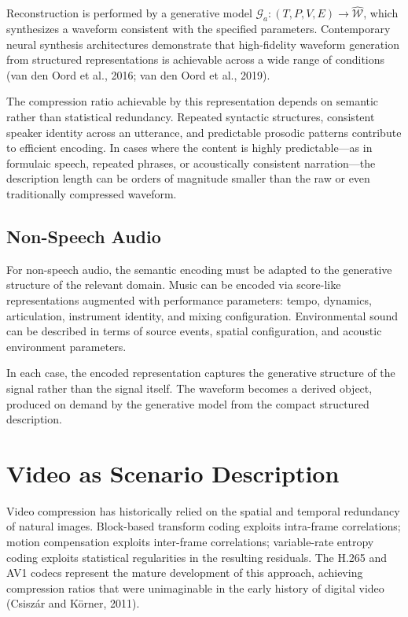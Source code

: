 \documentclass[11pt,a4paper]{article}
\theoremstyle{definition}
\theoremstyle{remark}
\begin{document}
Reconstruction is performed by a generative model $\mathcal{G}_a : (T, P, V, E) \rightarrow \widehat{\mathcal{W}}$, which synthesizes a waveform consistent with the specified parameters. Contemporary neural synthesis architectures demonstrate that high-fidelity waveform generation from structured representations is achievable across a wide range of conditions (van den Oord et al., 2016; van den Oord et al., 2019).

The compression ratio achievable by this representation depends on semantic rather than statistical redundancy. Repeated syntactic structures, consistent speaker identity across an utterance, and predictable prosodic patterns contribute to efficient encoding. In cases where the content is highly predictable---as in formulaic speech, repeated phrases, or acoustically consistent narration---the description length can be orders of magnitude smaller than the raw or even traditionally compressed waveform.

\subsection{Non-Speech Audio}

For non-speech audio, the semantic encoding must be adapted to the generative structure of the relevant domain. Music can be encoded via score-like representations augmented with performance parameters: tempo, dynamics, articulation, instrument identity, and mixing configuration. Environmental sound can be described in terms of source events, spatial configuration, and acoustic environment parameters.

In each case, the encoded representation captures the generative structure of the signal rather than the signal itself. The waveform becomes a derived object, produced on demand by the generative model from the compact structured description.

\section{Video as Scenario Description}
\label{sec:video}

Video compression has historically relied on the spatial and temporal redundancy of natural images. Block-based transform coding exploits intra-frame correlations; motion compensation exploits inter-frame correlations; variable-rate entropy coding exploits statistical regularities in the resulting residuals. The H.265 and AV1 codecs represent the mature development of this approach, achieving compression ratios that were unimaginable in the early history of digital video (Csisz\'{a}r and K\"{o}rner, 2011).
\end{document}

